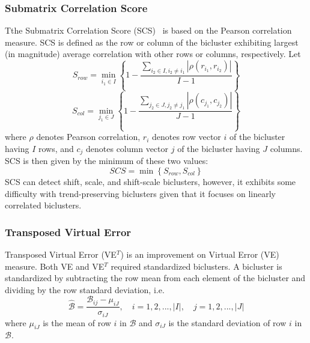 \subsubsection*{ Submatrix Correlation Score}
Tthe Submatrix Correlation Score (SCS)~\cite{yang2011finding} is based on the Pearson correlation measure.
SCS is defined as the row or column of the bicluster exhibiting largest (in magnitude) average correlation with other rows or columns, respectively.
Let
\begin{equation}
	S_{row} = \min_{i_1 \in I} \left\{ 1 - \frac{\sum_{i_2 \in I, i_2 \ne i_1} |\rho(r_{i_1}, r_{i_2})|}{I-1} \right\}
\end{equation}
\begin{equation}
	S_{col} = \min_{j_1 \in J} \left\{ 1 - \frac{\sum_{j_2 \in J, j_2 \ne j_1} |\rho(c_{j_1}, c_{j_2})|}{J-1} \right\}
\end{equation}
where $\rho$ denotes Pearson correlation, $r_i$ denotes row vector $i$ of the bicluster having $I$ rows, and $c_j$ denotes column vector $j$ of the bicluster having $J$ columns.
SCS is then given by the minimum of these two values:
\begin{equation}
	SCS = \min\left\{S_{row}, S_{col}\right\}
\end{equation}
SCS can detect shift, scale, and shift-scale biclusters, however, it exhibits some difficulty with trend-preserving biclusters given that it focuses on linearly correlated biclusters.

\subsubsection*{ Transposed Virtual Error}
Transposed Virtual Error (VE$^T$) \cite{pontes2010measuring} is an improvement on Virtual Error (VE) \cite{pontes2007virtual} measure.
Both VE and VE$^T$ required standardized biclusters. A bicluster is standardized by subtracting the row mean from each element of the bicluster and dividing by the row standard deviation, i.e.
\begin{equation}\label{standardize_bicluster}
	\hat{\mathcal{B}} = \frac{\mathcal{B}_{ij} - \mu_{iJ}}{\sigma_{iJ}}, \quad i = 1, 2, ..., \lvert I \rvert, \quad j = 1, 2, ..., \lvert J \rvert
\end{equation}
where $\mu_{iJ}$ is the mean of row $i$ in $\mathcal{B}$ and $\sigma_{iJ}$ is the standard deviation of row $i$ in $\mathcal{B}$.

